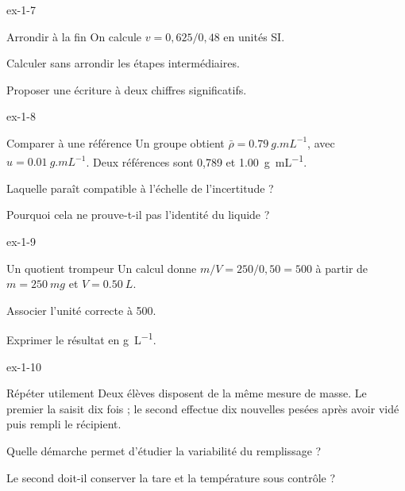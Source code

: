 \begin{blocLivre}{ex-1-7}\begin{exercice}[2]{Arrondir à la fin}
On calcule $v=0,625/0,48$ en unités SI.
\begin{questions}
\item Calculer sans arrondir les étapes intermédiaires.
\item Proposer une écriture à deux chiffres significatifs.
\end{questions}
\end{exercice}\end{blocLivre}
\begin{blocLivre}{ex-1-8}\begin{exercice}[2]{Comparer à une référence}
Un groupe obtient $\bar \rho=\qty{0,79}{g.mL^{-1}}$, avec $u=\qty{0,01}{g.mL^{-1}}$. Deux références sont 0,789 et \qty{1,00}{g.mL^{-1}}.
\begin{questions}
\item Laquelle paraît compatible à l’échelle de l’incertitude ?
\item Pourquoi cela ne prouve-t-il pas l’identité du liquide ?
\end{questions}
\end{exercice}\end{blocLivre}
\begin{blocLivre}{ex-1-9}\begin{exercice}[3]{Un quotient trompeur}
Un calcul donne $m/V=250/0,50=500$ à partir de $m=\qty{250}{mg}$ et $V=\qty{0,50}{L}$.
\begin{questions}
\item Associer l’unité correcte à 500.
\item Exprimer le résultat en \unit{g.L^{-1}}.
\end{questions}
\end{exercice}\end{blocLivre}
\begin{blocLivre}{ex-1-10}\begin{exercice}[3]{Répéter utilement}
Deux élèves disposent de la même mesure de masse. Le premier la saisit dix fois ; le second effectue dix nouvelles pesées après avoir vidé puis rempli le récipient.
\begin{questions}
\item Quelle démarche permet d’étudier la variabilité du remplissage ?
\item Le second doit-il conserver la tare et la température sous contrôle ?
\end{questions}
\end{exercice}\end{blocLivre}
